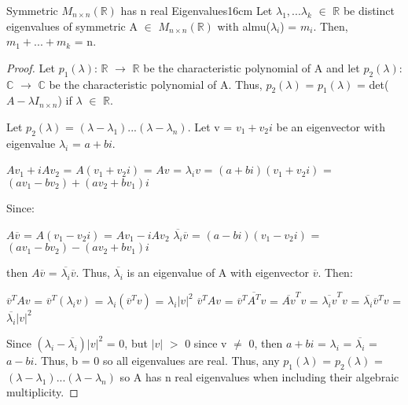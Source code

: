    \begin{wtheorem}{Symmetric $M_{n \times n}(\mathbb{R})$ has n
    real Eigenvalues}{16cm}
        Let $\lambda_1,...\lambda_k$ $\in$ $\mathbb{R}$ be distinct
        eigenvalues of symmetric A $\in$ $M_{n \times n}(\mathbb{R})$
        with almu($\lambda_i$) = $m_i$. Then, $m_1 + ... + m_k$ = n.
    \end{wtheorem}

    \begin{proof}
        Let $p_1(\lambda)$: $\mathbb{R}$ $\rightarrow$ $\mathbb{R}$
        be the characteristic polynomial of A and
        let $p_2(\lambda)$: $\mathbb{C}$ $\rightarrow$ $\mathbb{C}$
        be the characteristic polynomial of A.
        Thus, $p_2(\lambda)$ = $p_1(\lambda)$ = det($A - \lambda I_{n \times n}$)
        if $\lambda$ $\in$ $\mathbb{R}$.

        Let $p_2(\lambda)$ = $(\lambda - \lambda_1)...(\lambda - \lambda_n)$.
        Let v = $v_1 + v_2i$ be an eigenvector with eigenvalue
        $\lambda_i$ = $a + bi$.

        \hspace{0.5cm}
        $Av_1 + iAv_2$
        = $A(v_1+v_2i)$
        = $Av$
        = $\lambda_i v$
        = $(a+bi)(v_1 + v_2i)$
        = $(av_1 - bv_2) + (av_2 + bv_1)i$

        Since:

        \hspace{0.5cm}
        $A\overline{v}$
        = $A(v_1 - v_2i)$
        = $Av_1 - iAv_2$
        \hspace{1cm}
        $\overline{\lambda_i} \overline{v}$
        = $(a-bi)(v_1 - v_2i)$
        = $(av_1 - bv_2) - (av_2 + bv_1)i$

        then $A\overline{v}$ = $\overline{\lambda_i} \overline{v}$.
        Thus, $\overline{\lambda_i}$ is an eigenvalue of A with eigenvector
        $\overline{v}$. Then:

        \hspace{0.5cm}
        $\overline{v}^T Av$
        = $\overline{v}^T (\lambda_i v)$
        = $\lambda_i(\overline{v}^T v)$
        = $\lambda_i |v|^2$
        \hspace{0.5cm}
        $\overline{v}^T Av$
        = $\overline{v}^T \overline{A^T} v$
        = $\overline{Av}^T v$
        = $\overline{\lambda_i v}^T v$
        = $\overline{\lambda_i} \overline{v}^T v$
        = $\overline{\lambda_i} |v|^2$

        Since $(\lambda_i - \overline{\lambda_i})|v|^2$ = 0,
        but $|v|$ $>$ 0 since v $\not =$ 0, then
        $a+bi$ = $\lambda_i$ = $\overline{\lambda_i}$ = $a-bi$.
        Thus, b = 0 so all eigenvalues are real.
        Thus, any $p_1(\lambda)$ = $p_2(\lambda)$
        = $(\lambda - \lambda_1)...(\lambda - \lambda_n)$
        so A has n real eigenvalues when including their algebraic multiplicity.
    \end{proof}

